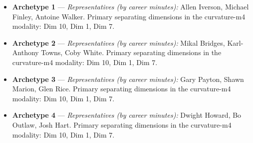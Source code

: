 \begin{itemize}
\item \textbf{Archetype 1} --- \emph{Representatives (by career minutes):} Allen Iverson, Michael Finley, Antoine Walker. Primary separating dimensions in the curvature-m4 modality: Dim 10, Dim 1, Dim 7.
\item \textbf{Archetype 2} --- \emph{Representatives (by career minutes):} Mikal Bridges, Karl-Anthony Towns, Coby White. Primary separating dimensions in the curvature-m4 modality: Dim 10, Dim 1, Dim 7.
\item \textbf{Archetype 3} --- \emph{Representatives (by career minutes):} Gary Payton, Shawn Marion, Glen Rice. Primary separating dimensions in the curvature-m4 modality: Dim 10, Dim 1, Dim 7.
\item \textbf{Archetype 4} --- \emph{Representatives (by career minutes):} Dwight Howard, Bo Outlaw, Josh Hart. Primary separating dimensions in the curvature-m4 modality: Dim 10, Dim 1, Dim 7.
\end{itemize}
